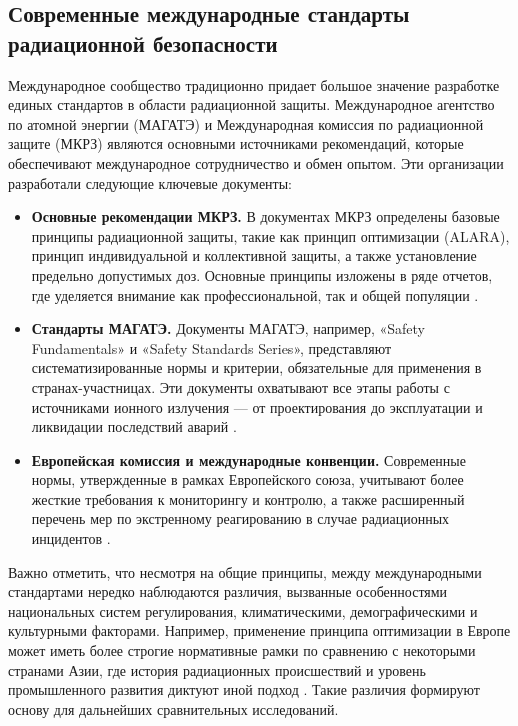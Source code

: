 \documentclass[a4paper, 14pt]{extarticle}
\begin{document}
\subsection{Современные международные стандарты радиационной безопасности}

Международное сообщество традиционно придает большое значение разработке единых стандартов в области радиационной защиты. Международное агентство по атомной энергии (МАГАТЭ) \cite{4} и Международная комиссия по радиационной защите (МКРЗ) \cite{5} являются основными источниками рекомендаций, которые обеспечивают международное сотрудничество и обмен опытом. Эти организации разработали следующие ключевые документы:

\begin{itemize}
    \item \textbf{Основные рекомендации МКРЗ.} В документах МКРЗ определены базовые принципы радиационной защиты, такие как принцип оптимизации (ALARA), принцип индивидуальной и коллективной защиты, а также установление предельно допустимых доз. Основные принципы изложены в ряде отчетов, где уделяется внимание как профессиональной, так и общей популяции \cite{5}.

    \item \textbf{Стандарты МАГАТЭ.} Документы МАГАТЭ, например, «Safety Fundamentals» и «Safety Standards Series», представляют систематизированные нормы и критерии, обязательные для применения в странах-участницах. Эти документы охватывают все этапы работы с источниками ионного излучения — от проектирования до эксплуатации и ликвидации последствий аварий \cite{4}.

    \item \textbf{Европейская комиссия и международные конвенции.} Современные нормы, утвержденные в рамках Европейского союза, учитывают более жесткие требования к мониторингу и контролю, а также расширенный перечень мер по экстренному реагированию в случае радиационных инцидентов \cite{6}.
\end{itemize}

Важно отметить, что несмотря на общие принципы, между международными стандартами нередко наблюдаются различия, вызванные особенностями национальных систем регулирования, климатическими, демографическими и культурными факторами. Например, применение принципа оптимизации в Европе может иметь более строгие нормативные рамки по сравнению с некоторыми странами Азии, где история радиационных происшествий и уровень промышленного развития диктуют иной подход \cite{7}. Такие различия формируют основу для дальнейших сравнительных исследований.
\end{document}
